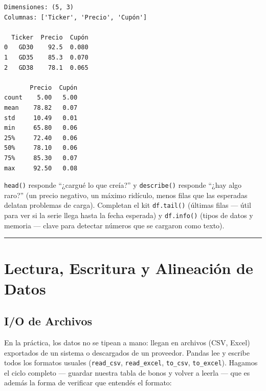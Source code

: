 \documentclass[
  spanish,
  letterpaper,
  DIV=11,
  numbers=noendperiod]{scrreprt}
\begin{document}
\begin{verbatim}
Dimensiones: (5, 3)
Columnas: ['Ticker', 'Precio', 'Cupón']

  Ticker  Precio  Cupón
0   GD30    92.5  0.080
1   GD35    85.3  0.070
2   GD38    78.1  0.065

       Precio  Cupón
count    5.00   5.00
mean    78.82   0.07
std     10.49   0.01
min     65.80   0.06
25%     72.40   0.06
50%     78.10   0.06
75%     85.30   0.07
max     92.50   0.08
\end{verbatim}

\texttt{head()} responde ``¿cargué lo que creía?'' y \texttt{describe()}
responde ``¿hay algo raro?'' (un precio negativo, un máximo ridículo,
menos filas que las esperadas delatan problemas de carga). Completan el
kit \texttt{df.tail()} (últimas filas --- útil para ver si la serie
llega hasta la fecha esperada) y \texttt{df.info()} (tipos de datos y
memoria --- clave para detectar números que se cargaron como texto).

\begin{center}\rule{0.5\linewidth}{0.5pt}\end{center}

\section{Lectura, Escritura y Alineación de
Datos}\label{lectura-escritura-y-alineaciuxf3n-de-datos}

\subsection{I/O de Archivos}\label{io-de-archivos}

En la práctica, los datos no se tipean a mano: llegan en archivos (CSV,
Excel) exportados de un sistema o descargados de un proveedor. Pandas
lee y escribe todos los formatos usuales (\texttt{read\_csv},
\texttt{read\_excel}, \texttt{to\_csv}, \texttt{to\_excel}). Hagamos el
ciclo completo --- guardar nuestra tabla de bonos y volver a leerla ---
que es además la forma de verificar que entendés el formato:
\end{document}
